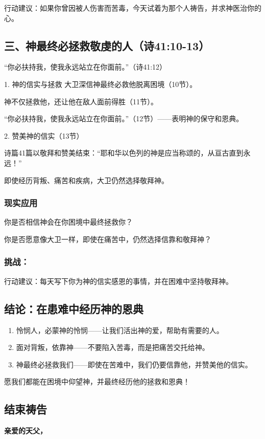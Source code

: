 \documentclass[a4paper, 12pt]{article}
\begin{document}
行动建议：如果你曾因被人伤害而苦毒，今天试着为那个人祷告，并求神医治你的心。
\subsection*{三、神最终必拯救敬虔的人（诗41:10-13）}
“你必扶持我，使我永远站立在你面前。”（诗41:12）

1. 神的信实与拯救
大卫深信神最终必救他脱离困境（10节）。

神不仅拯救他，还让他在敌人面前得胜（11节）。

“你必扶持我，使我永远站立在你面前。”（12节）——表明神的保守和恩典。

2. 赞美神的信实（13节）

诗篇41篇以敬拜和赞美结束：“耶和华以色列的神是应当称颂的，从亘古直到永远！”

即使经历背叛、痛苦和疾病，大卫仍然选择敬拜神。
\subsubsection*{现实应用}

\hspace{0.6cm}你是否相信神会在你困境中最终拯救你？

你是否愿意像大卫一样，即使在痛苦中，仍然选择信靠和敬拜神？
\subsubsection*{挑战：}

行动建议：每天写下你为神的信实感恩的事情，并在困难中坚持敬拜神。
\subsection*{结论：在患难中经历神的恩典}
\begin{enumerate}
    \item 怜悯人，必蒙神的怜悯——让我们活出神的爱，帮助有需要的人。

    \item 面对背叛，依靠神——不要陷入苦毒，而是把痛苦交托给神。

    \item 神最终必拯救我们——即使在苦难中，我们仍要信靠他，并赞美他的信实。

\end{enumerate}

愿我们都能在困境中仰望神，并最终经历他的拯救和恩典！

\subsection*{结束祷告}
\textbf{亲爱的天父，}
\end{document}

